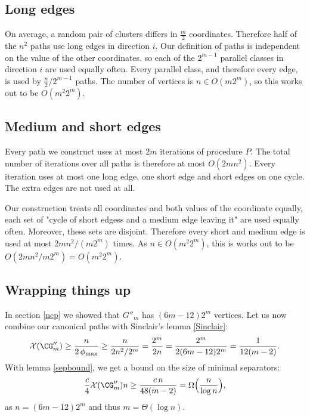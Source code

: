 \subsection{Long edges}

On average, a random pair of clusters differs in $\frac{m}{2}$ coordinates. Therefore half of the $n^2$ paths use long edges in direction $i$.
Our definition of paths is independent on the value of the other coordinates. so each of the $2^{m-1}$ parallel classes in direction $i$ are used
equally often. Every parallel class, and therefore every edge, is used by $\frac{n}{2} / 2^{m-1}$ paths.  The number of vertices is $n \in O(m2^m)$, so this works out to be $O(m^2 2^m)$.

\subsection{Medium and short edges}

Every path we construct uses at most $2m$ iterations of procedure $P$. The total number of iterations over all paths is therefore at most
$O(2mn^2)$.  Every iteration uses at most one long edge, one short edge and short edges
on one cycle. The extra edges are not used at all. 

Our construction treats all coordinates and both values of the coordinate equally, each set of "cycle of short edgess and a medium edge leaving it"
are used equally often. Moreover, these sets are disjoint. Therefore every short and medium edge is used at most $2mn^2 / (m2^m)$ times. 
As $n \in O(m^2 2^m)$, this is works out to be $O(2mn^2 / m2^m) = O(m^2 2^m)$. 

\subsection{Wrapping things up}

In section \ref{ncp} we showed that $G''_m$ has $(6m-12)2^m$ vertices. Let us
now combine our canonical paths with Sinclair's lemma \ref{Sinclair}:
\begin{equation}
\mathcal{X}(\CG_m'') 
\ge \frac{n}{2\,\phi_{\max}} 
\ge \frac{n}{2n^2/2^m}
  = \frac{2^m}{2n}
  = \frac{2^m}{2(6m-12)2^m}
  = \frac{1}{12(m-2)}. 
\end{equation}
With lemma \ref{sepbound}, we get a bound on the size of minimal separators:
\begin{equation}
\frac c4 \mathcal{X}(\CG_m'')n 
\ge \frac{c\,n}{48(m-2)} 
 =  \Omega\Big(\frac n{\log n}\Big),
\end{equation}
as $n = (6m-12)2^m$ and thus $m=\Theta(\log n)$.

